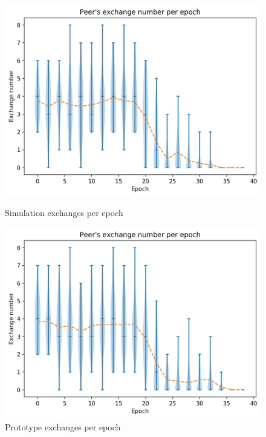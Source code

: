 \documentclass[mscthesis]{usiinfthesis}
\begin{document}
\begin{figure}[H]
   \begin{minipage}{0.49\textwidth}
     \centering
     \includegraphics[width=\linewidth]{images/5/5-exchanges.png}
  	\caption{Simulation exchanges per epoch}
  	\label{fig:sim-one-duplicates}
   \end{minipage}\hfill
   \begin{minipage}{0.49\textwidth}
     \centering
     \includegraphics[width=\linewidth]{images/6/6-exchanges.png}
       \caption{Prototype exchanges per epoch}
 		\label{fig:sim-two-duplicates}
   \end{minipage}
\end{figure}
\end{document}
